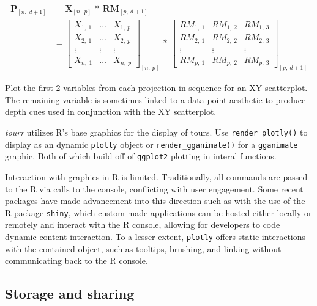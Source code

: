 \documentclass{monashthesis}
\begin{document}
\begin{align}
  \textbf{P}_{[n,~d+1]}
    &= \textbf{X}_{[n,~p]} ~*~ \textbf{RM}_{[p,~d+1]} \\
    &=
      \begin{bmatrix}
          X_{1,~1} & \dots & X_{1,~p} \\
          X_{2,~1} & \dots & X_{2,~p} \\
          \vdots   & \vdots & \vdots  \\
          X_{n,~1} & \dots & X_{n,~p}
      \end{bmatrix}_{[n,~p]}
      ~*~
      \begin{bmatrix}
        RM_{1,~1} & RM_{1,~2} & RM_{1,~3} \\
        RM_{2,~1} & RM_{2,~2} & RM_{2,~3} \\
        \vdots     & \vdots     & \vdots     \\
        RM_{p,~1} & RM_{p,~2} & RM_{p,~3}
      \end{bmatrix}_{[p,~d+1]}
\end{align}

Plot the first 2 variables from each projection in sequence for an XY
scatterplot. The remaining variable is sometimes linked to a data point
aesthetic to produce depth cues used in conjunction with the XY
scatterplot.

\emph{tourr} utilizes R's base graphics for the display of tours. Use
\texttt{render\_plotly()} to display as an dynamic \texttt{plotly}
\textcite{sievert_plotly_2018} object or \texttt{render\_gganimate()}
for a \texttt{gganimate} \textcite{pedersen_gganimate:_2019} graphic.
Both of which build off of \texttt{ggplot2} plotting in interal
functions.

Interaction with graphics in R is limited. Traditionally, all commands
are passed to the R via calls to the console, conflicting with user
engagement. Some recent packages have made advancement into this
direction such as with the use of the R package \texttt{shiny}, which
custom-made applications can be hosted either locally or remotely and
interact with the R console, allowing for developers to code dynamic
content interaction. To a lesser extent, \texttt{plotly} offers static
interactions with the contained object, such as tooltips, brushing, and
linking without communicating back to the R console.

\subsection{Storage and sharing}\label{storage-and-sharing}
\end{document}
